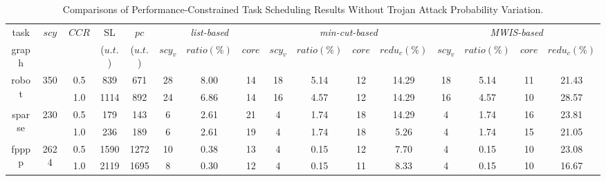 \documentclass[10pt,journal]{IEEEtran}
\begin{document}
\begin{table}[!t]
\renewcommand{\arraystretch}{1.1}
\caption{Comparisons of Performance-Constrained Task Scheduling Results Without Trojan Attack Probability Variation.}
\centering
\begin{tabular}{c|c|c|c|c|c|c|c|c|c|c|c|c|c|c|c}
\hline
\hline
task                 &\multicolumn{1}{c|}{\multirow{2}{*}{$scy$}}                     &\multicolumn{1}{c|}{\multirow{2}{*}{$CCR$}}     &SL    & $pc$              &\multicolumn{3}{c|}{\textit{list-based}}        &\multicolumn{4}{c|}{\textit{min-cut-based}}    &\multicolumn{4}{|c}{\textit{MWIS-based}}    \\ \cline{6-8} \cline{9-12} \cline{13-16}
graph           &    &   &($u.t.$)   &($u.t.$)    &\multicolumn{1}{c|}{\multirow{1}{*}{$scy_v$}} &\hspace*{-0.4em}$ratio(\%)$\hspace*{-0.4em}    &$core$   &$scy_v$       &\hspace*{-0.4em}$ratio(\%)$\hspace*{-0.4em}  &$core$ &\hspace*{-0.4em}$redu_{c}(\%)$\hspace*{-0.4em}  &$scy_v$       &\hspace*{-0.4em}$ratio(\%)$\hspace*{-0.4em}   &$core$   &\hspace*{-0.4em}$redu_{c}(\%)$\hspace*{-0.4em} \\

\hline
\hline

\multicolumn{1}{c|}{\multirow{2}{*}{robot}}      &\multicolumn{1}{c|}{\multirow{2}{*}{350}} &0.5 &839 &671 &28   &8.00   &14  &18 &5.14  &12   &14.29  &18  &5.14  &11        &21.43 \\
                                              &                                &1.0  &1114  &892  &24 &6.86  &14  &16 &4.57    &12  &14.29  &16 &4.57  &10       &28.57     \\
\hline

\multicolumn{1}{c|}{\multirow{2}{*}{sparse}}    &\multicolumn{1}{c|}{\multirow{2}{*}{230}}  &0.5 &179 &143 &6  &2.61  &21  &4 &1.74  &18  &14.29  &4     &1.74 &16        &23.81 \\
&     &1.0 &236  &189  &6   &2.61   &19  &4 &1.74  &18   &5.26 &4   &1.74   &15      &21.05 \\

\hline

\multicolumn{1}{c|}{\multirow{2}{*}{fpppp}}     &\multicolumn{1}{c|}{\multirow{2}{*}{2624}}   &0.5 &1590  &1272  &10  &0.38 &13  &4 &0.15  &12 &7.70  &4   &0.15   &10        &23.08  \\
&   &1.0 &2119  &1695  &8   &0.30   &12  &4 &0.15 &11  &8.33  &4   &0.15  &10       &16.67  \\


\end{tabular}
\end{table}
\end{document}
